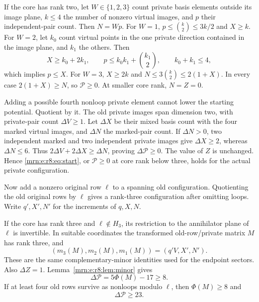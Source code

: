 \documentclass[11pt,a4paper]{article}
\theoremstyle{remark}\newtheorem{remark}[theorem]{Remark}
\begin{document}
If the core has rank two, let $W\in\{1,2,3\}$ count private basis elements outside its image plane, $k\le4$ the number of nonzero virtual images, and $p$ their independent-pair count. Then $N=Wp$. For $W=1$, $p\le\binom{k}{2}\le3k/2$ and $X\ge k$. For $W=2$, let $k_0$ count virtual points in the one private direction contained in the image plane, and $k_1$ the others. Then
\[
 X\ge k_0+2k_1,\qquad p\le k_0k_1+\binom{k_1}{2},\qquad k_0+k_1\le4,
\]
which implies $p\le X$. For $W=3$, $X\ge2k$ and $N\le3\binom{k}{2}\le2(1+X)$. In every case $2(1+X)\ge N$, so $\mathcal P\ge0$. At smaller core rank, $N=Z=0$.

Adding a possible fourth nonloop private element cannot lower the starting potential. Quotient by it. The old private images span dimension two, with private-pair count $\Delta V\ge1$. Let $\Delta X$ be their mixed basis count with the four marked virtual images, and $\Delta N$ the marked-pair count. If $\Delta N>0$, two independent marked and two independent private images give $\Delta X\ge2$, whereas $\Delta N\le6$. Thus $2\Delta V+2\Delta X\ge\Delta N$, proving $\Delta\mathcal P\ge0$. The value of $Z$ is unchanged. Hence \eqref{mrn:e:r8:eq:start}, or $\mathcal P\ge0$ at core rank below three, holds for the actual private configuration.

Now add a nonzero original row $\ell$ to a spanning old configuration. Quotienting the old original rows by $\ell$ gives a rank-three configuration after omitting loops. Write $q',X',N'$ for the increments of $q,X,N$.

If the core has rank three and $\ell\notin H_3$, its restriction to the annihilator plane of $\ell$ is invertible. In suitable coordinates the transformed old-row/private matrix $M$ has rank three, and
\[
 (m_3(M),m_2(M),m_1(M))=(q'V,X',N').
\]
These are the same complementary-minor identities used for the endpoint sectors. Also $\Delta Z=1$. Lemma~\ref{mrn:e:r8:lem:minor} gives
\begin{equation}\label{mrn:e:r8:eq:outside}
 \Delta\mathcal P=5\Phi(M)-17\ge8.
\end{equation}
If at least four old rows survive as nonloops modulo $\ell$, then $\Phi(M)\ge8$ and
\begin{equation}\label{mrn:e:r8:eq:strongoutside}
 \Delta\mathcal P\ge23.
\end{equation}
\end{document}
